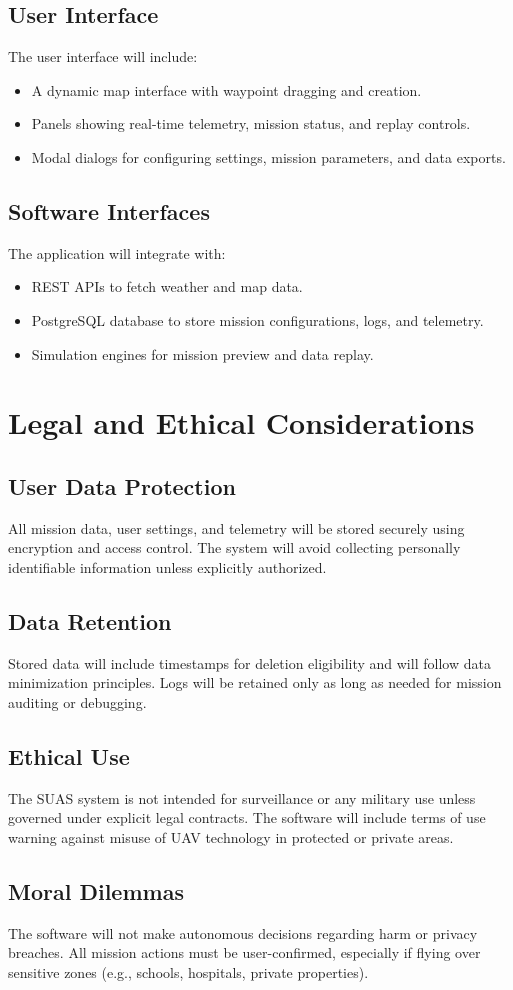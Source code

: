 \documentclass{article}
\begin{document}
\subsection{User Interface}
The user interface will include:
\begin{itemize}
    \item A dynamic map interface with waypoint dragging and creation.
    \item Panels showing real-time telemetry, mission status, and replay controls.
    \item Modal dialogs for configuring settings, mission parameters, and data exports.
\end{itemize}

\subsection{Software Interfaces}
The application will integrate with:
\begin{itemize}
    \item REST APIs to fetch weather and map data.
    \item PostgreSQL database to store mission configurations, logs, and telemetry.
    \item Simulation engines for mission preview and data replay.
\end{itemize}

\section{Legal and Ethical Considerations}
\subsection{User Data Protection}
All mission data, user settings, and telemetry will be stored securely using encryption and access control. The system will avoid collecting personally identifiable information unless explicitly authorized.

\subsection{Data Retention}
Stored data will include timestamps for deletion eligibility and will follow data minimization principles. Logs will be retained only as long as needed for mission auditing or debugging.

\subsection{Ethical Use}
The SUAS system is not intended for surveillance or any military use unless governed under explicit legal contracts. The software will include terms of use warning against misuse of UAV technology in protected or private areas.

\subsection{Moral Dilemmas}
The software will not make autonomous decisions regarding harm or privacy breaches. All mission actions must be user-confirmed, especially if flying over sensitive zones (e.g., schools, hospitals, private properties).
\end{document}

